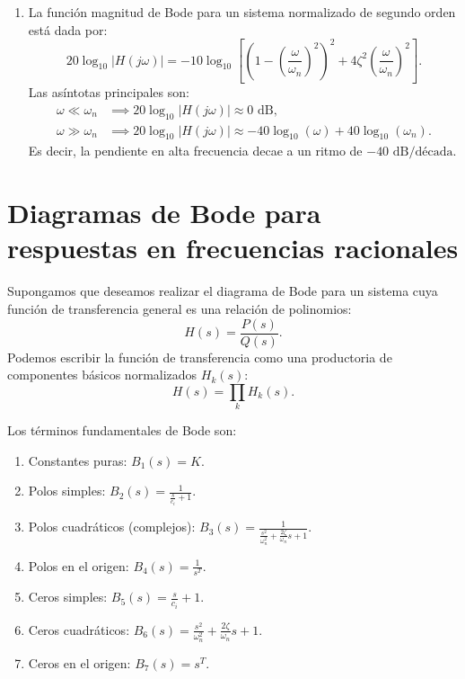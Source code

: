 \begin{enumerate}
\begin{enumerate}
		\item En el caso $\zeta = 1$ (Sistema Cr\'{i}ticamente Amortiguado): $c_{1} = c_{2} = -\omega_{n}$. La respuesta al impulso es:
		\begin{equation}
			h_{1}(t) = \omega_{n}^{2} t e^{-\omega_{n} t} u(t).
		\end{equation}
	\end{enumerate}
	
	\item La funci\'{o}n magnitud de Bode para un sistema normalizado de segundo orden est\'{a} dada por:
	\begin{equation}
		20\log_{10} |H(j\omega)| = -10\log_{10} \left[ \left(1 - \left(\frac{\omega}{\omega_{n}}\right)^{2}\right)^{2} + 4\zeta^{2} \left(\frac{\omega}{\omega_{n}}\right)^{2} \right].
	\end{equation}
	Las as\'{i}ntotas principales son:
	\begin{align}
		\omega \ll \omega_{n} &\implies 20\log_{10} |H(j\omega)| \approx 0 \text{ dB}, \\
		\omega \gg \omega_{n} &\implies 20\log_{10} |H(j\omega)| \approx -40\log_{10}(\omega) + 40\log_{10}(\omega_{n}).
	\end{align}
	Es decir, la pendiente en alta frecuencia decae a un ritmo de $-40 \text{ dB/d\'{e}cada}$.
\end{enumerate}

\section{Diagramas de Bode para respuestas en frecuencias racionales}

Supongamos que deseamos realizar el diagrama de Bode para un sistema cuya funci\'{o}n de transferencia general es una relaci\'{o}n de polinomios:
\begin{equation}
	H(s) = \frac{P(s)}{Q(s)}.
\end{equation}
Podemos escribir la funci\'{o}n de transferencia como una productoria de componentes b\'{a}sicos normalizados $H_{k}(s)$:
\begin{equation}
	H(s) = \prod_{k} H_{k}(s).
\end{equation}

Los t\'{e}rminos fundamentales de Bode son:
\begin{enumerate}
	\item Constantes puras: $B_{1}(s) = K$.
	\item Polos simples: $B_{2}(s) = \frac{1}{\frac{s}{c_i} + 1}$.
	\item Polos cuadr\'{a}ticos (complejos): $B_{3}(s) = \frac{1}{\frac{s^2}{\omega_n^2} + \frac{2\zeta}{\omega_n} s + 1}$.
	\item Polos en el origen: $B_{4}(s) = \frac{1}{s^{T}}$.
	\item Ceros simples: $B_{5}(s) = \frac{s}{c_i} + 1$.
	\item Ceros cuadr\'{a}ticos: $B_{6}(s) = \frac{s^2}{\omega_n^2} + \frac{2\zeta}{\omega_n} s + 1$.
	\item Ceros en el origen: $B_{7}(s) = s^{T}$.
\end{enumerate}

